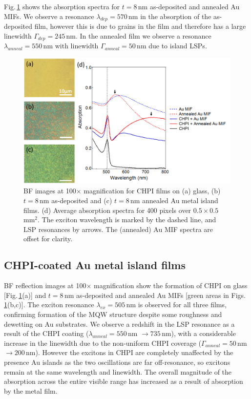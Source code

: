 Fig.\,\ref{6Fig3} shows the absorption spectra for $t=8$\,nm as-deposited and annealed Au MIFs. We observe a resonance $\lambda_{dep} = 570$\,nm in the absorption of the as-deposited film, however this is due to grains in the film and therefore has a large linewidth $\Gamma_{dep} = 245$\,nm. In the annealed film we observe a resonance $\lambda_{anneal} = 550$\,nm with linewidth $\Gamma_{anneal} = 50$\,nm due to island LSPs.

\begin{figure}[h!] 
\centering    
\includegraphics[width=\textwidth]{Fig3}
\caption{BF images at 100$\times$ magnification for CHPI films on (a) glass, (b) $t=8$\,nm as-deposited and (c) $t=8$\,nm annealed Au metal island films. (d) Average absorption spectra for 400 pixels over $0.5\times0.5$\,mm$^2$. The exciton wavelength is marked by the dashed line, and LSP resonances by arrows. The (annealed) Au MIF spectra are offset for clarity.}
\label{6Fig3}
\end{figure}
\subsection{CHPI-coated Au metal island films}

BF reflection images at 100$\times$ magnification show the formation of CHPI on glass [Fig.\,\ref{6Fig3}(a)] and $t=8$\,nm as-deposited and annealed Au MIFs [green areas in Figs.\,\ref{6Fig3}(b,c)]. The exciton resonance $\lambda_{ex} = 505$\,nm is observed for all three films, confirming formation of the MQW structure despite some roughness and dewetting on Au substrates. We observe a redshift in the LSP resonance as a result of the CHPI coating ($\lambda_{anneal} = 550$\,nm $\rightarrow 735$\,nm), with a considerable increase in the linewidth due to the non-uniform CHPI coverage ($\Gamma_{anneal} = 50$\,nm $\rightarrow 200$\,nm). However the excitons in CHPI are completely unaffected by the presence Au islands as the two oscillations are far off-resonance, so excitons remain at the same wavelength and linewidth. The overall magnitude of the absorption across the entire visible range has increased as a result of absorption by the metal film.


